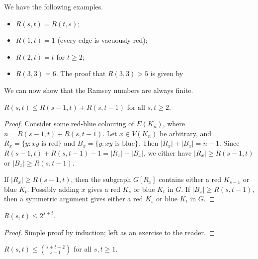 \documentclass[main.tex]{subfiles}
\begin{document}
We have the following examples.
\begin{example*}
  \listhack
  \begin{itemize}
    \item $R(s,t) = R(t,s)$;
    \item $R(1,t) = 1$ (every edge is vacuously red);
    \item $R(2,t) = t$ for $t\geq 2$;
    \item $R(3,3) = 6$. The proof that $R(3,3) > 5$ is given by
      \begin{center}
      \end{center}
  \end{itemize}
\end{example*}
We can now show that the Ramsey numbers are always finite.
\begin{proposition}
  $R(s,t)\leq R(s-1,t) + R(s,t-1)$ for all $s,t\geq 2$.
\end{proposition}
\begin{proof}
  Consider some red-blue colouring of $E(K_n)$, where $n = R(s-1,t) + R(s,t-1)$.
  Let $x\in V(K_n)$ be arbitrary, and $R_x = \{y : xy\text{ is red}\}$ and
  $B_x = \{y : xy\text{ is blue}\}$.
  Then $|R_x| + |B_x| = n - 1$.
  Since $R(s-1,t) + R(s,t-1) - 1 = |R_x| + |B_x|$,
  we either have $|R_x|\geq R(s-1,t)$ or $|B_x|\geq R(s,t-1)$.

  If $|R_x|\geq R(s-1,t)$, then the subgraph $G[R_x]$ contains either a red
  $K_{s-1}$ or blue $K_t$.
  Possibly adding $x$ gives a red $K_s$ or blue $K_t$ in $G$.
  If $|B_x|\geq R(s,t-1)$, then a symmetric argument gives either a red $K_s$
  or blue $K_t$ in $G$.
\end{proof}
\begin{corollary}
  $R(s,t)\leq 2^{s+t}$.
\end{corollary}
\begin{proof}
  Simple proof by induction; left as an exercise to the reader.
\end{proof}
\begin{theorem}
  $R(s,t)\leq\binom{s+t-2}{s-1}$ for all $s,t\geq 1$.
\end{theorem}
\end{document}
